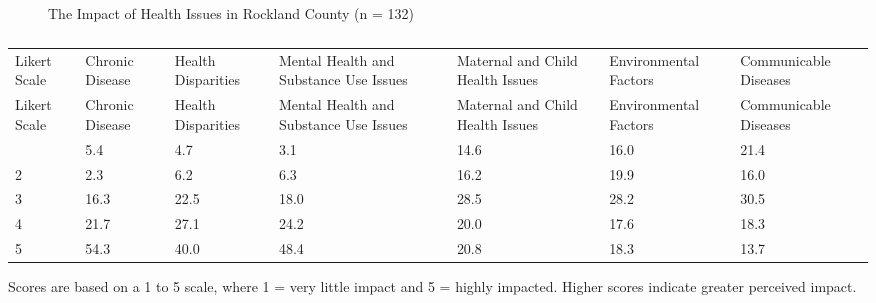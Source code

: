 \documentclass[
  english,
  letterpaper,
]{report}
\begin{document}
\begin{figure}


\caption{\label{fig-rc-impact-hlth-issue}The Impact of Health Issues in
Rockland County (n = 132)}

\end{figure}%

\begin{longtable}[]{@{}lllllll@{}}

\caption{\label{tbl-rc-impact-hlth-issue}The Impact of Health Issues in
Rockland County (n = 132)}

\tabularnewline

\caption{}\label{T_f08e9}\tabularnewline
\toprule\noalign{}
Likert Scale & Chronic Disease & Health Disparities & Mental Health and
Substance Use Issues & Maternal and Child Health Issues & Environmental
Factors & Communicable Diseases \\
\midrule\noalign{}
\endfirsthead
\toprule\noalign{}
Likert Scale & Chronic Disease & Health Disparities & Mental Health and
Substance Use Issues & Maternal and Child Health Issues & Environmental
Factors & Communicable Diseases \\
\midrule\noalign{}
\endhead
\bottomrule\noalign{}
\endlastfoot
1 & 5.4 & 4.7 & 3.1 & 14.6 & 16.0 & 21.4 \\
2 & 2.3 & 6.2 & 6.3 & 16.2 & 19.9 & 16.0 \\
3 & 16.3 & 22.5 & 18.0 & 28.5 & 28.2 & 30.5 \\
4 & 21.7 & 27.1 & 24.2 & 20.0 & 17.6 & 18.3 \\
5 & 54.3 & 40.0 & 48.4 & 20.8 & 18.3 & 13.7 \\

\end{longtable}

\begin{tcolorbox}[enhanced jigsaw, breakable, leftrule=.75mm, title=\textcolor{quarto-callout-note-color}{\faInfo}\hspace{0.5em}{Note}, bottomrule=.15mm, opacityback=0, left=2mm, colback=white, bottomtitle=1mm, coltitle=black, colbacktitle=quarto-callout-note-color!10!white, colframe=quarto-callout-note-color-frame, opacitybacktitle=0.6, toptitle=1mm, titlerule=0mm, arc=.35mm, rightrule=.15mm, toprule=.15mm]

Scores are based on a 1 to 5 scale, where 1 = very little impact and 5 =
highly impacted. Higher scores indicate greater perceived impact.

\end{tcolorbox}
\end{document}
